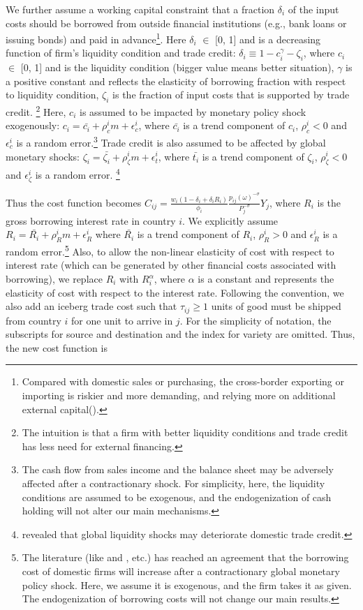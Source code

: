 We further assume a working capital constraint that a fraction $\delta_i$ of the input costs should be borrowed from outside financial institutions (e.g., bank loans or issuing bonds) and paid in advance\footnote{Compared with domestic sales or purchasing, the cross-border exporting or importing is riskier and more demanding, and relying more on additional external capital(\cite{manova2013credit}).}. Here $\delta_i$ $\in$ [0, 1] and is a decreasing function of firm's liquidity condition and trade credit: $\delta_i \equiv 1-c_i^\gamma-\zeta_i$, where $c_i$ $\in$ [0, 1] and is the liquidity condition (bigger value means better situation), $\gamma$ is a positive constant and reflects the elasticity of borrowing fraction with respect to liquidity condition, $\zeta_i$ is the fraction of input costs that is supported by trade credit. \footnote{The intuition is that a firm with better liquidity conditions and trade credit has less need for external financing.} Here, $c_i$ is assumed to be impacted by monetary policy shock exogenously: $c_i=\bar{c_i}+\rho_c^i m+\epsilon_c^i$, where $\bar{c_i}$ is a trend component of $c_i$, $\rho_c^i<0$ and $\epsilon_c^i$ is a random error.\footnote{The cash flow from sales income and the balance sheet may be adversely affected after a contractionary shock. For simplicity, here, the liquidity conditions are assumed to be exogenous, and the endogenization of cash holding will not alter our main mechanisms.} Trade credit is also assumed to be affected by global monetary shocks: $\zeta_i=\bar{\zeta_i}+\rho_\zeta^i m+\epsilon_t^i$, where $\bar{t_i}$ is a trend component of $\zeta_i$, $\rho_\zeta^i<0$ and $\epsilon_\zeta^i$ is a random error. \footnote{\cite{lin2018foreign} revealed that global liquidity shocks may deteriorate domestic trade credit.} 

Thus the cost function becomes $ C_{ij}=\frac{w_i(1-\delta_i+\delta_i R_i)}{\phi_i} \frac{p_{ij}(\omega)^{-\sigma}}{P_j^{-\sigma}} Y_j$, where $R_i$ is the gross borrowing interest rate in country $i$. We explicitly assume $R_i=\bar{R_i}+\rho_R^i m+\epsilon_R^i$ where $\bar{R_i}$ is a trend component of $R_i$, $\rho_R^i>0$ and $\epsilon_R^i$ is a random error.\footnote{The literature (like \cite{georgiadis2016determinants} and \cite{miranda2020us}, etc.) has reached an agreement that the borrowing cost of domestic firms will increase after a contractionary global monetary policy shock. Here, we assume it is exogenous, and the firm takes it as given. The endogenization of borrowing costs will not change our main results.} Also, to allow the non-linear elasticity of cost with respect to interest rate (which can be generated by other financial costs associated with borrowing), we replace $R_i$ with $R_i^\alpha$, where $\alpha$ is a constant and represents the elasticity of cost with respect to the interest rate. Following the convention, we also add an iceberg trade cost such that $\tau_{ij}\geq1$ units of good must be shipped from country $i$ for one unit to arrive in $j$. For the simplicity of notation, the subscripts for source and destination and the index for variety are omitted. Thus, the new cost function is


